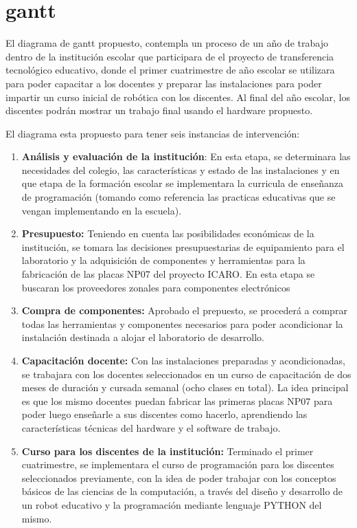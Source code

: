 \section{gantt}

El diagrama de gantt propuesto, contempla un proceso de un año de trabajo dentro de la institución escolar que participara de el proyecto de transferencia tecnológico educativo, donde el primer cuatrimestre de año escolar se utilizara para poder capacitar a los docentes y preparar las instalaciones para poder impartir un curso inicial de robótica con los discentes. Al final del año escolar, los discentes podrán mostrar un trabajo final usando el hardware propuesto.

El diagrama esta propuesto para tener seis instancias de intervención:

\begin{enumerate}
  \item \textbf{Análisis y evaluación de la institución}: En esta etapa, se determinara las necesidades del colegio, las características y estado de las instalaciones y en que etapa de la formación escolar se implementara la curricula de enseñanza de programación (tomando como referencia las practicas educativas que se vengan implementando en la escuela).
  \item \textbf{Presupuesto:} Teniendo en cuenta las posibilidades económicas de la institución, se tomara las decisiones presupuestarias de equipamiento para el laboratorio y la adquisición de componentes y herramientas para la fabricación de las placas NP07 del proyecto ICARO. En esta etapa se buscaran los proveedores zonales para componentes electrónicos 
  \item \textbf{Compra de componentes:} Aprobado el prepuesto, se procederá a comprar todas las herramientas y componentes necesarios para poder acondicionar la instalación destinada a alojar el laboratorio de desarrollo.
  \item \textbf{Capacitación docente:} Con las instalaciones preparadas y acondicionadas, se trabajara con los docentes seleccionados en un curso de capacitación de dos meses de duración  y cursada semanal (ocho clases en total). La idea principal es que los mismo docentes puedan fabricar las primeras placas NP07 para poder luego enseñarle a sus discentes como hacerlo, aprendiendo las características técnicas del hardware y el software de trabajo.
  \item \textbf{Curso para los discentes de la institución:} Terminado el primer cuatrimestre, se implementara el curso de programación  para los discentes seleccionados previamente, con la idea de poder trabajar con los conceptos básicos de las ciencias de la computación, a través del diseño y desarrollo de un robot educativo y la programación mediante lenguaje PYTHON del mismo.

\end{enumerate}
